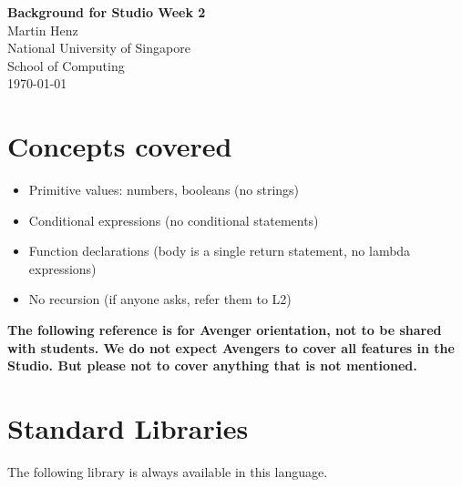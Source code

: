 


        
  \thispagestyle{empty}
  
\begin{center}
  {\Large {\bf Background for Studio Week 2}}\\[10mm]

  {\large Martin Henz}\\[5mm]

  {\large National University of Singapore \\
          School of Computing}\\[10mm]

  {\large \today}\\[10mm]
\end{center}
\section{Concepts covered}

\begin{itemize}
\item Primitive values: numbers, booleans (no strings)
\item Conditional expressions (no conditional statements)
\item Function declarations (body is a single return statement, no lambda expressions)
\item No recursion (if anyone asks, refer them to L2)
\end{itemize}

\textbf{The following reference is for Avenger orientation, not to be shared with students.
We do not expect Avengers to cover all features in the Studio. But please 
not to cover anything that is not mentioned.}





\newpage













\section{Standard Libraries}

The following library is always available in this language.






    
